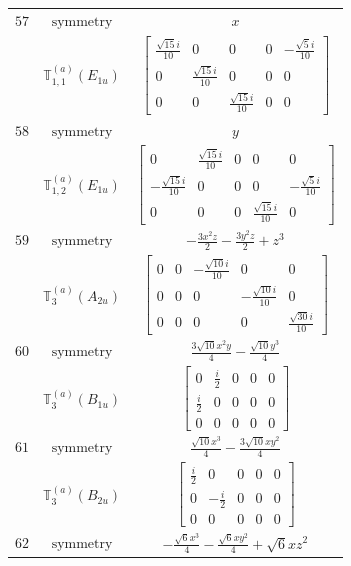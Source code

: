 \documentclass[fleqn,8pt,landscape]{jsarticle}
\begin{document}
\begin{longtable}{ccc}
$ 57 $ & $ \text{symmetry} $ & $ x $ \\
$  $ & $ \mathbb{T}_{1,1}^{(a)}(E_{1u}) $ & $ \begin{bmatrix} \frac{\sqrt{15} i}{10} & 0 & 0 & 0 & - \frac{\sqrt{5} i}{10} \\ 0 & \frac{\sqrt{15} i}{10} & 0 & 0 & 0 \\ 0 & 0 & \frac{\sqrt{15} i}{10} & 0 & 0 \end{bmatrix} $ \\ \hline
$ 58 $ & $ \text{symmetry} $ & $ y $ \\
$  $ & $ \mathbb{T}_{1,2}^{(a)}(E_{1u}) $ & $ \begin{bmatrix} 0 & \frac{\sqrt{15} i}{10} & 0 & 0 & 0 \\ - \frac{\sqrt{15} i}{10} & 0 & 0 & 0 & - \frac{\sqrt{5} i}{10} \\ 0 & 0 & 0 & \frac{\sqrt{15} i}{10} & 0 \end{bmatrix} $ \\ \hline
$ 59 $ & $ \text{symmetry} $ & $ - \frac{3 x^{2} z}{2} - \frac{3 y^{2} z}{2} + z^{3} $ \\
$  $ & $ \mathbb{T}_{3}^{(a)}(A_{2u}) $ & $ \begin{bmatrix} 0 & 0 & - \frac{\sqrt{10} i}{10} & 0 & 0 \\ 0 & 0 & 0 & - \frac{\sqrt{10} i}{10} & 0 \\ 0 & 0 & 0 & 0 & \frac{\sqrt{30} i}{10} \end{bmatrix} $ \\ \hline
$ 60 $ & $ \text{symmetry} $ & $ \frac{3 \sqrt{10} x^{2} y}{4} - \frac{\sqrt{10} y^{3}}{4} $ \\
$  $ & $ \mathbb{T}_{3}^{(a)}(B_{1u}) $ & $ \begin{bmatrix} 0 & \frac{i}{2} & 0 & 0 & 0 \\ \frac{i}{2} & 0 & 0 & 0 & 0 \\ 0 & 0 & 0 & 0 & 0 \end{bmatrix} $ \\ \hline
$ 61 $ & $ \text{symmetry} $ & $ \frac{\sqrt{10} x^{3}}{4} - \frac{3 \sqrt{10} x y^{2}}{4} $ \\
$  $ & $ \mathbb{T}_{3}^{(a)}(B_{2u}) $ & $ \begin{bmatrix} \frac{i}{2} & 0 & 0 & 0 & 0 \\ 0 & - \frac{i}{2} & 0 & 0 & 0 \\ 0 & 0 & 0 & 0 & 0 \end{bmatrix} $ \\ \hline
$ 62 $ & $ \text{symmetry} $ & $ - \frac{\sqrt{6} x^{3}}{4} - \frac{\sqrt{6} x y^{2}}{4} + \sqrt{6} x z^{2} $ \\

\end{longtable}
\end{document}
